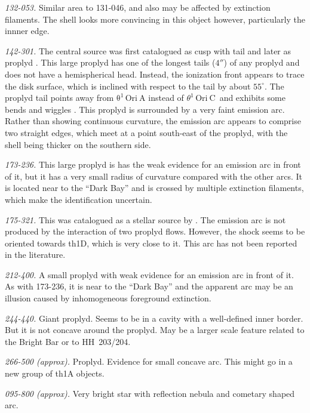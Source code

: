 \documentclass[apj, twocolumn]{aastex63}
\newcommand\thC{\ensuremath{\theta^1\,\mathrm{Ori~C}}}
\begin{document}
\textit{132-053.}  Similar area to 131-046, and also may be affected
by extinction filaments. The shell looks more convincing in this
object however, particularly the innner edge.

\textit{142-301.} The central source was first catalogued as
cusp with tail \citep{ODell:1996a} and later as proplyd
\citep{Bally:2000a, Ricci:2008a}. This large proplyd has
one of the longest tails (\(4''\)) of any proplyd and does
not have a hemispherical head. Instead, the ionization front
appears to trace the disk surface, which is inclined with
respect to the tail by about $55^{\circ}$. The proplyd tail
points away from \(\mathrm{\theta^1\,Ori~A}\) instead of \thC~and
exhibits some bends and wiggles \citep{Bally:2000a}. This proplyd
is surrounded by a very faint emission arc.  Rather than showing
continuous curvature, the emission arc appears to comprise two
straight edges, which meet at a point south-east of the proplyd,
with the shell being thicker on the southern side.

\textit{173-236.} This large proplyd is has the weak evidence for an
emission arc in front of it, but it has a very small radius of
curvature compared with the other arcs.  It is located near to the
``Dark Bay'' \citep{ODell:2000a} and is crossed by multiple extinction
filaments, which make the identification uncertain.

\textit{175-321.} This was catalogued as a stellar source by \citet{ODell:1996a}.
The emission arc is not produced by the interaction of two proplyd flows. However,
the shock seems to be oriented towards th1D, which is very close to it. This arc
has not been reported in the literature.

\textit{212-400.}  A small proplyd with weak evidence for an emission
arc in front of it.  As with 173-236, it is near to the ``Dark Bay''
and the apparent arc may be an illusion caused by inhomogeneous
foreground extinction.

\textit{244-440.} Giant proplyd.  Seems to be in a cavity with a
well-defined inner border.  But it is not concave around the proplyd.
May be a larger scale feature related to the Bright Bar or to
HH~203/204.

\textit{266-500 (approx).} Proplyd. Evidence for small concave arc.
This might go in a new group of th1A objects.

\textit{095-800 (approx).} Very bright star with reflection nebula
and cometary shaped arc. 

\label{sec:problematic-group}


\end{document}
